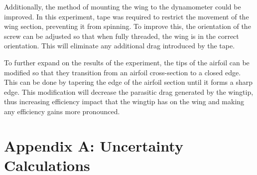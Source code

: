 \documentclass[journal,letterpaper]{IEEEtran}
\begin{document}
Additionally, the method of mounting the wing to the dynamometer could be improved.
In this experiment, tape was required to restrict the movement of the wing section, preventing it from spinning.
To improve this, the orientation of the screw can be adjusted so that when fully threaded, the wing is in the correct orientation.
This will eliminate any additional drag introduced by the tape.

To further expand on the results of the experiment, the tips of the airfoil can be modified so that they transition from an airfoil cross-section to a closed edge.
This can be done by tapering the edge of the airfoil section until it forms a sharp edge.
This modification will decrease the parasitic drag generated by the wingtip, thus increasing efficiency impact that the wingtip has on the wing and making any efficiency gains more pronounced.


\section*{Appendix A: Uncertainty Calculations}
\end{document}
